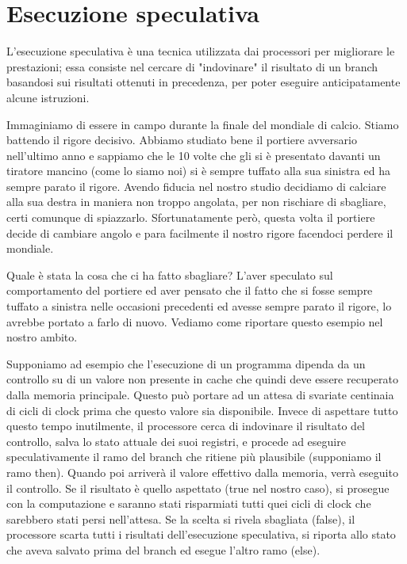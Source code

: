 	\section{Esecuzione speculativa}
		L'esecuzione speculativa è una tecnica utilizzata dai processori per migliorare le prestazioni; essa consiste nel cercare di "indovinare" il risultato di un branch basandosi sui risultati ottenuti in precedenza, per poter eseguire anticipatamente alcune istruzioni.
		
		Immaginiamo di essere in campo durante la finale del mondiale di calcio. Stiamo battendo il rigore decisivo. Abbiamo studiato bene il portiere avversario nell'ultimo anno e sappiamo che le 10 volte che gli si è presentato davanti un tiratore mancino (come lo siamo noi) si è sempre tuffato alla sua sinistra ed ha sempre parato il rigore. Avendo fiducia nel nostro studio decidiamo di calciare alla sua destra in maniera non troppo angolata, per non rischiare di sbagliare, certi comunque di spiazzarlo. Sfortunatamente però, questa volta il portiere decide di cambiare angolo e para facilmente il nostro rigore facendoci perdere il mondiale.
		
		Quale è stata la cosa che ci ha fatto sbagliare? L'aver speculato sul comportamento del portiere ed aver pensato che il fatto che si fosse sempre tuffato a sinistra nelle occasioni precedenti ed avesse sempre parato il rigore, lo avrebbe portato a farlo di nuovo. Vediamo come riportare questo esempio nel nostro ambito. 
		
		Supponiamo ad esempio che l'esecuzione di un programma dipenda da un controllo su di un valore non presente in cache che quindi deve essere recuperato dalla memoria principale. Questo può portare ad un attesa di svariate centinaia di cicli di clock prima che questo valore sia disponibile. Invece di aspettare tutto questo tempo inutilmente, il processore cerca di indovinare il risultato del controllo, salva lo stato attuale dei suoi registri, e procede ad eseguire speculativamente il ramo del branch che ritiene più plausibile (supponiamo il ramo then). Quando poi arriverà il valore effettivo dalla memoria, verrà eseguito il controllo. Se il risultato è quello aspettato (true nel nostro caso), si prosegue con la computazione e saranno stati risparmiati tutti quei cicli di clock che sarebbero stati persi nell'attesa. Se la scelta si rivela sbagliata (false), il processore scarta tutti i risultati dell'esecuzione speculativa, si riporta allo stato che aveva salvato prima del branch ed esegue l'altro ramo (else).
		
